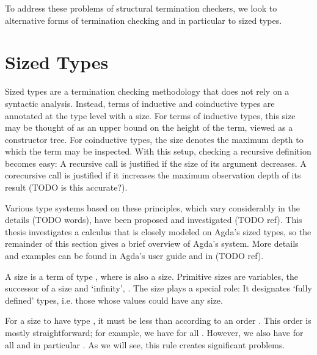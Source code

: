 To address these problems of structural termination checkers, we look to
alternative forms of termination checking and in particular to sized types.


\section{Sized Types}
\label{sec:background:sized}

Sized types are a termination checking methodology that does not rely on a
syntactic analysis. Instead, terms of inductive and coinductive types are
annotated at the type level with a size. For terms of inductive types, this size
may be thought of as an upper bound on the height of the term, viewed as a
constructor tree. For coinductive types, the size denotes the maximum depth to
which the term may be inspected. With this setup, checking a recursive
definition becomes easy: A recursive call is justified if the size of its
argument decreases. A corecursive call is justified if it increases the maximum
observation depth of its result (TODO is this accurate?).

Various type systems based on these principles, which vary considerably in the
details (TODO words), have been proposed and investigated (TODO ref). This
thesis investigates a calculus that is closely modeled on Agda's sized types, so
the remainder of this section gives a brief overview of Agda's system. More
details and examples can be found in Agda's user guide and in (TODO ref).

A size is a term of type , where  is also a size.
Primitive sizes are variables, the successor of a size  and
\enquote*{infinity}, . The size  plays a special role: It
designates \enquote*{fully defined} types, i.e. those whose values could have any
size.

For a size  to have type , it must be less than
 according to an order \icode{<}. This order is mostly straightforward;
for example, we have  for all . However, we also have
 for all  and in particular . As we will see,
this rule creates significant problems.

